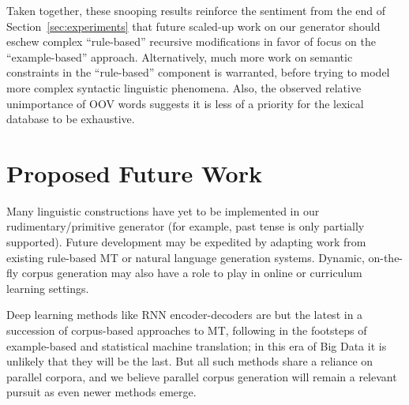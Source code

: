 {Taken together, these snooping results reinforce the sentiment from the end of Section~\ref{sec:experiments} that future scaled-up work on our generator should eschew complex ``rule-based'' recursive modifications in favor of focus on the ``example-based'' approach.
Alternatively, much more work on semantic constraints in the ``rule-based'' component is warranted, before trying to model more complex syntactic linguistic phenomena.
Also, the observed relative unimportance of OOV words suggests it is less of a priority for the lexical database to be exhaustive.








} %








\section{Proposed Future Work}
\label{sec:future}


Many linguistic constructions have yet to be implemented in our rudimentary/primitive generator (for example, past tense is only partially supported).
Future development may be expedited by adapting work from existing rule-based MT or natural language generation systems. 
Dynamic, on-the-fly corpus generation may also have a role to play in online or curriculum learning settings.

Deep learning methods like RNN encoder-decoders  are but the latest in a succession of corpus-based approaches to MT, following in the footsteps of example-based and statistical machine translation; in this era of Big Data it is unlikely that they will be the last.
But all such methods share a reliance on parallel corpora, and we believe parallel corpus generation will remain a relevant pursuit as even newer methods emerge.

